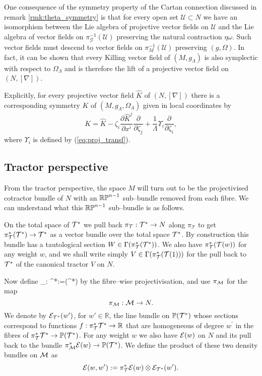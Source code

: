 One consequence of the symmetry property of the Cartan connection discussed in remark \ref{rmk:theta_symmetry} is that for every open set $\mathcal{U}\subset N$ we have an isomorphism between the Lie algebra of projective vector fields on $\mathcal{U}$ and the Lie algebra of vector fields on $\pi_\mathcal{G}^{-1}(\mathcal{U})$ preserving the natural contraction $\eta\omega$. Such vector fields must descend to vector fields on $\pi_M^{-1}(\mathcal{U})$ preserving $(g,\Omega)$. In fact, it can be shown that every Killing vector field of $(M,g_\Lambda)$ is also symplectic with respect to $\Omega_\Lambda$ and is therefore the lift of a projective vector field on $(N,[\nabla])$.

Explicitly, for every projective vector field $\widehat{K}$ of $(N,[\nabla])$
there is a corresponding symmetry $K$ of $(M,g_{\Lambda},\Omega_\Lambda)$
given in local coordinates by 
\begin{equation}
{K}=\widehat{K}-\zeta_{i}\frac{\partial \widehat{K}^{j}}{\partial x^{i}}\frac{\partial}{\partial \zeta_{j}}+\frac{1}{\Lambda}\Upsilon_{i}\frac{\partial}{\partial \zeta_{i}},\label{eq:kvf_from_pvf}
\end{equation}
where $\Upsilon_{i}$ is defined by (\ref{eq:proj_transf}).

\subsection{Tractor perspective} \label{sec:trac_construction}

From the tractor perspective, the space $M$ will turn out to be the projectivised cotractor bundle of $N$ with an $\mathbb{RP}^{n-1}$ sub--bundle removed from each fibre. We can understand what this $\mathbb{RP}^{n-1}$ sub--bundle is as follows.

On the total space of $\mathcal{T}^*$ we pull back $\pi_\mathcal{T}:\mathcal{T}^*\to N$ along $\pi_\mathcal{T}$ to get $\pi_\mathcal{T}^*(\mathcal{T}^*)\to \mathcal{T}^*$ as a vector bundle over the total space $\mathcal{T}^*$. By construction this bundle has a tautological section $W\in \Gamma (\pi_{\mathcal{T}}^*(\mathcal{T}^*))$.  We also have $\pi_{\mathcal{T}}^*(\mathcal{T}(w))$ for any weight $w$, and we shall write simply $V\in \Gamma(\pi_{\mathcal{T}}^*(\mathcal{T}(1)))$ for the pull back to $\mathcal{T}^*$ of the canonical tractor $V$ on $N$.

Now define
\be
\label{projection_map}
\kappa_\PP: \cT^*\longrightarrow {}:=(\cT^*)
\ee
by the fibre--wise projectivisation, and use $\pi_{\mathcal{M}}$ for the map
$$
\pi_{\mathcal{M}}:\mathcal{M}\to N.
$$
We denote by $\mathcal{E}_{\mathcal{T}^*}(w')$, for $w'\in \mathbb{R}$, the line
bundle on $\mathbb{P}(\mathcal{T}^*)$ whose sections correspond to functions
$f: \pi_{\mathcal{T}}^*\mathcal{T}^* \to\mathbb{R} $ that are homogeneous of degree $w^\prime$ in
the fibres of $\pi_{\mathcal{T}}^*\mathcal{T}^*\to \mathbb{P}(\mathcal{T}^*)$. For any weight $w$ we also have $\mathcal{E}(w)$ on $N$ and its pull back to the bundle $\pi_{\mathcal{M}}^*\mathcal{E}(w)\to \mathbb{P}(\mathcal{T}^*)$.
We define the product of these two density bundles on $\mathcal{M}$ as
$$
\mathcal{E}(w,w'):= \pi_{\mathcal{T}}^*\mathcal{E}(w) \otimes \mathcal{E}_{\mathcal{T}^*}(w').
$$

